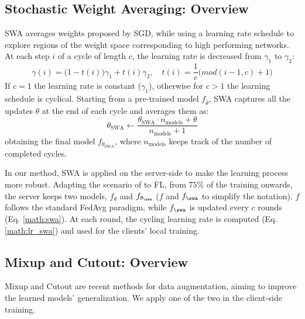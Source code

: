 \subsection{Stochastic Weight Averaging: Overview}
SWA averages weights proposed by SGD, while using a learning rate schedule to explore regions of the weight space corresponding to high performing networks. At each step $i$ of a cycle of length $c$, the learning rate is decreased from $\gamma_1$ to $\gamma_2$:
\begin{equation}
    \gamma(i) = \big(1-t(i)\big) \gamma_1 + t(i) \gamma_2, \quad t(i) = \frac{1}{c}\big(mod(i-1,c)+1\big) 
    \label{math:lr_swa}
\end{equation}
If $c=1$ the learning rate is constant ($\gamma_1$), otherwise for $c>1$ the learning schedule is cyclical. Starting from a pre-trained model $f_{\hat{\theta}}$, SWA captures all the updates $\theta$ at the end of each cycle and averages them as:
\begin{equation}
    \theta_{\text{SWA}} \leftarrow \frac{\theta_{\text{SWA}}\cdot n_{\text{models}} + \theta}{n_{\text{models}}+1}
    \label{math:swa}
\end{equation}
obtaining the final model $f_{\theta_{\text{SWA}}}$, where $n_\text{models}$ keeps track of the number of completed cycles.

In our method, SWA is applied on the server-side to make the learning process more robust. 
Adapting the scenario of \cite{izmailov2018averaging} to FL, from $75\%$ of the training onwards, the server keeps two models, $f_\theta$ and $f_{\theta_{\text{\swa}}}$ ($f$ and $f_{\text{\swa}}$ to simplify the notation). $f$ follows the standard FedAvg paradigm, while $f_{\text{\swa}}$ is updated every $c$ rounds (Eq. \ref{math:swa}). At each round, the cycling learning rate is computed (Eq. \ref{math:lr_swa}) and used for the clients' local training.

\subsection{Mixup and Cutout: Overview}
Mixup and Cutout are recent methods for data augmentation, aiming to improve the learned models' generalization. We apply one of the two in the client-side training.


